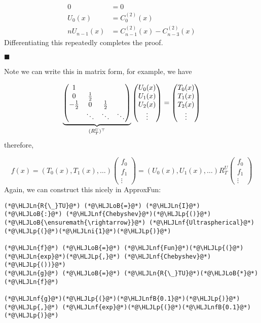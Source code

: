 \documentclass[12pt,a4paper]{article}
\newcommand{\HLJLn}[1]{#1}
\newcommand{\HLJLnf}[1]{\textcolor[RGB]{66,102,213}{#1}}
\newcommand{\HLJLnfB}[1]{\textcolor[RGB]{59,151,46}{#1}}
\newcommand{\HLJLni}[1]{\textcolor[RGB]{59,151,46}{#1}}
\newcommand{\HLJLoB}[1]{\textcolor[RGB]{102,102,102}{\textbf{#1}}}
\newcommand{\HLJLp}[1]{#1}
\def\half{ {1 \over 2} }
\begin{document}
\begin{align*}
    0 &= 0\\
    U_0(x) &= C_0^{(2)}(x) \\
   n U_{n-1}(x) &= C_{n-1}^{(2)}(x)  - C_{n-3}^{(2)}(x)
\end{align*}
Differentiating this repeatedly completes the proof.

\ensuremath{\blacksquare}

Note we can write this in matrix form, for example, we have

\[
\underbrace{\begin{pmatrix}1 \cr
                    0 & \half\cr
                       -\half & 0 & \half \cr
                           &\ddots &\ddots & \ddots\end{pmatrix} }_{(R_T^U)^\top} \begin{pmatrix}
                           U_0(x) \\ U_1(x) \\ U_2(x) \\ \vdots \end{pmatrix}  =  \begin{pmatrix} T_0(x) \\ T_1(x) \\ T_2(x) \\ \vdots \end{pmatrix}
\]
therefore,

\[
f(x) =  (T_0(x),T_1(x),\ldots) \begin{pmatrix} f_0\\f_1\\\vdots \end{pmatrix} =  (U_0(x),U_1(x),\ldots) R_T^U \begin{pmatrix} f_0\\f_1\\\vdots \end{pmatrix}
\]
Again, we can construct this nicely in ApproxFun:


\begin{lstlisting}
(*@\HLJLn{R{\_}TU}@*) (*@\HLJLoB{=}@*) (*@\HLJLn{I}@*) (*@\HLJLoB{:}@*) (*@\HLJLnf{Chebyshev}@*)(*@\HLJLp{()}@*) (*@\HLJLoB{\ensuremath{\rightarrow}}@*) (*@\HLJLnf{Ultraspherical}@*)(*@\HLJLp{(}@*)(*@\HLJLni{1}@*)(*@\HLJLp{)}@*)

(*@\HLJLn{f}@*) (*@\HLJLoB{=}@*) (*@\HLJLnf{Fun}@*)(*@\HLJLp{(}@*)(*@\HLJLn{exp}@*)(*@\HLJLp{,}@*) (*@\HLJLnf{Chebyshev}@*)(*@\HLJLp{())}@*)
(*@\HLJLn{g}@*) (*@\HLJLoB{=}@*) (*@\HLJLn{R{\_}TU}@*)(*@\HLJLoB{*}@*)(*@\HLJLn{f}@*)

(*@\HLJLnf{g}@*)(*@\HLJLp{(}@*)(*@\HLJLnfB{0.1}@*)(*@\HLJLp{)}@*) (*@\HLJLp{,}@*) (*@\HLJLnf{exp}@*)(*@\HLJLp{(}@*)(*@\HLJLnfB{0.1}@*)(*@\HLJLp{)}@*)
\end{lstlisting}
\end{document}
